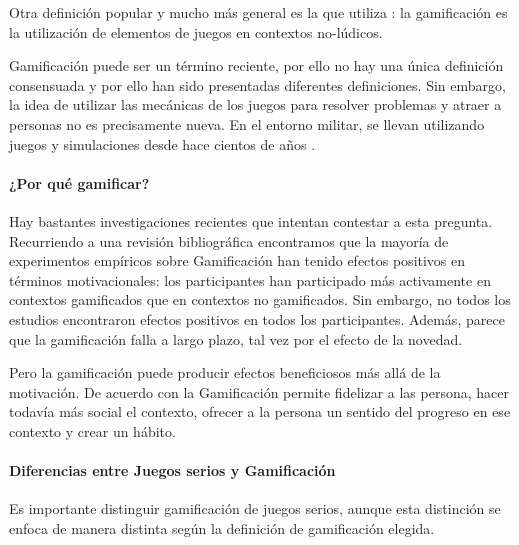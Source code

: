 Otra definición popular y mucho más general es la que utiliza  \cite{kwerb-WhatIs}: la gamificación es la utilización de elementos de juegos en contextos no-lúdicos.



Gamificación puede ser un término reciente, por ello no hay una única definición consensuada y por ello han sido presentadas diferentes definiciones.
%
Sin embargo, la idea de utilizar las mecánicas de los juegos para resolver problemas y atraer a personas no es precisamente nueva. 
%
En el entorno militar, se llevan utilizando juegos y simulaciones desde hace cientos  de años \citep{GamificationDefII}.

%
%



\paragraph{¿Por qué gamificar?} Hay bastantes investigaciones recientes que intentan contestar a esta pregunta.
%
Recurriendo a una revisión bibliográfica  \cite{EmpiricalGamification} encontramos que la mayoría de experimentos empíricos sobre Gamificación han tenido efectos positivos en términos motivacionales: los participantes han participado más activamente en contextos gamificados que en contextos no gamificados.
%
Sin embargo, no todos los estudios encontraron efectos positivos en todos los participantes.
%
Además, parece que la gamificación falla a largo plazo, tal vez por el efecto de la novedad. 

Pero la gamificación puede producir efectos beneficiosos más allá de la motivación.
% 
De acuerdo con  \cite{kwerb-WhyGamify} la Gamificación permite fidelizar a las persona, hacer todavía más social el contexto, ofrecer a la persona un sentido del progreso en ese contexto y crear un hábito.
%



\paragraph{Diferencias entre Juegos serios y Gamificación}

Es importante distinguir gamificación de juegos serios, aunque esta distinción se enfoca de manera distinta según la definición de gamificación elegida.


